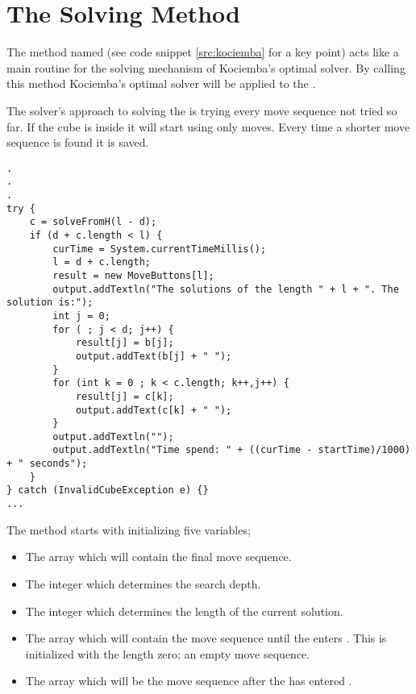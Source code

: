 \section{The Solving Method}
\label{sec:kSolve}
The method named  (see code snippet \ref{src:kociemba} for a key point) acts like a main routine for the solving mechanism of Kociemba's optimal solver. By calling this method Kociemba's optimal solver will be applied to the \rubik{}. 

The solver's approach to solving the \rubik{} is trying every move sequence not tried so far. If the cube is inside  it will start using only  moves. Every time a shorter move sequence is found it is saved. 

\begin{lstlisting}[style=sourceCode, caption=\myCaption{Key point in the solve method of Kociemba's optimal solver}, label=src:kociemba]
.
.
.
try {
	c = solveFromH(l - d);
	if (d + c.length < l) {
		curTime = System.currentTimeMillis();
		l = d + c.length;
		result = new MoveButtons[l];
		output.addTextln("The solutions of the length " + l + ". The solution is:");
		int j = 0;
		for ( ; j < d; j++) {
			result[j] = b[j];
			output.addText(b[j] + " ");
		}
		for (int k = 0 ; k < c.length; k++,j++) {
			result[j] = c[k];
			output.addText(c[k] + " ");
		}
		output.addTextln("");
		output.addTextln("Time spend: " + ((curTime - startTime)/1000) + " seconds");
	}
} catch (InvalidCubeException e) {}
...
\end{lstlisting}

The  method starts with initializing five variables; 
\begin{itemize}
\item The array  which will contain the final move sequence.
\item The integer  which determines the search depth. 
\item The integer  which determines the length of the current solution. 
\item The array  which will contain the move sequence until the \rubik{} enters . This is initialized with the length zero; an empty move sequence. 
\item The array  which will be the move sequence after the \rubik{} has entered .
\end{itemize}

